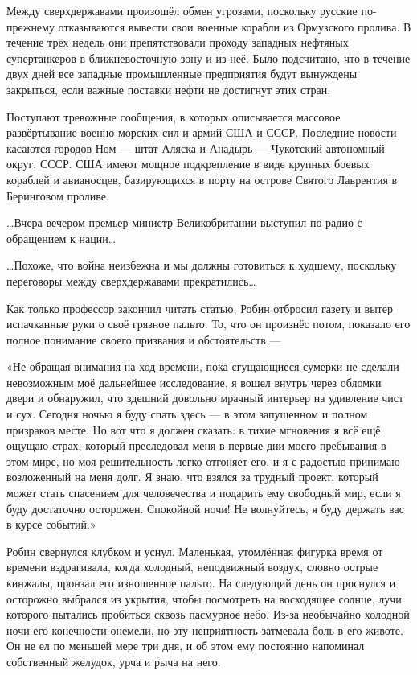 \documentclass[a5paper, 9pt,
final, openany, twoside=true]{memoir}
\begin{document}
Между сверхдержавами произошёл обмен угрозами, поскольку русские по-прежнему отказываются вывести свои военные корабли из Ормузского пролива. В течение трёх недель они препятствовали проходу западных нефтяных супертанкеров в ближневосточную зону и из неё. Было подсчитано, что в течение двух дней все западные промышленные предприятия будут вынуждены закрыться, если важные поставки нефти не достигнут этих стран.

Поступают тревожные сообщения, в которых описывается массовое развёртывание военно-морских сил и армий США и СССР. Последние новости касаются городов Ном — штат Аляска и Анадырь — Чукотский автономный округ, СССР. США имеют мощное подкрепление в виде крупных боевых кораблей и авианосцев, базирующихся в порту на острове Святого Лаврентия в Беринговом проливе.\bigskip

…Вчера вечером премьер-министр Великобритании выступил по радио с обращением к нации…\bigskip

…Похоже, что война неизбежна и мы должны готовиться к худшему, поскольку переговоры между сверхдержавами прекратились…\bigskip

Как только профессор закончил читать статью, Робин отбросил газету и вытер испачканные руки о своё грязное пальто. То, что он произнёс потом, показало его полное понимание своего призвания и обстоятельств —

«Не обращая внимания на ход времени, пока сгущающиеся сумерки не сделали невозможным моё дальнейшее исследование, я вошел внутрь через обломки двери и обнаружил, что здешний довольно мрачный интерьер на удивление чист и сух. Сегодня ночью я буду спать здесь — в этом запущенном и полном призраков месте. Но вот что я должен сказать: в тихие мгновения я всё ещё ощущаю страх, который преследовал меня в первые дни моего пребывания в этом мире, но моя решительность легко отгоняет его, и я с радостью принимаю возложенный на меня долг. Я знаю, что взялся за трудный проект, который может стать спасением для человечества и подарить ему свободный мир, если я буду достаточно осторожен. Спокойной ночи! Не волнуйтесь, я буду держать вас в курсе событий.»\bigskip

Робин свернулся клубком и уснул. Маленькая, утомлённая фигурка время от времени вздрагивала, когда холодный, неподвижный воздух, словно острые кинжалы, пронзал его изношенное пальто. На следующий день он проснулся и осторожно выбрался из укрытия, чтобы посмотреть на восходящее солнце, лучи которого пытались пробиться сквозь пасмурное небо. Из-за необычайно холодной ночи его конечности онемели, но эту неприятность затмевала боль в его животе. Он не ел по меньшей мере три дня, и об этом ему постоянно напоминал собственный желудок, урча и рыча на него.\bigskip
\end{document}
